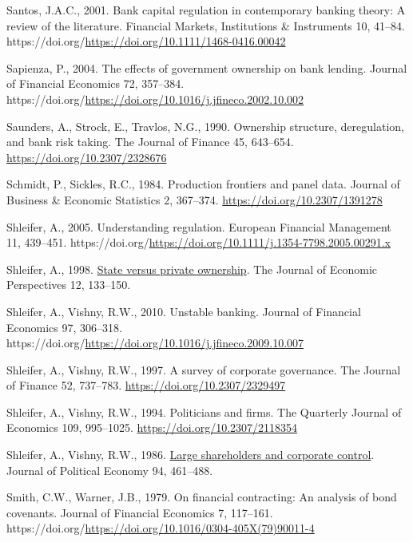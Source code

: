 \documentclass[
  12pt,
  a4paper,
]{scrreprt}
\newlength{\cslhangindent}
\newenvironment{CSLReferences}[2] %
 {\begin{list}{}{%
  \setlength{\itemindent}{0pt}
  \setlength{\leftmargin}{0pt}
  \setlength{\parsep}{0pt}
  \ifodd #1
   \setlength{\leftmargin}{\cslhangindent}
   \setlength{\itemindent}{-1\cslhangindent}
  \fi
  \setlength{\itemsep}{#2\baselineskip}}}
 {\end{list}}
\begin{document}
\begin{CSLReferences}{1}{0}
Santos, J.A.C., 2001. Bank capital regulation in contemporary banking
theory: A review of the literature. Financial Markets, Institutions \&
Instruments 10, 41--84.
https://doi.org/\url{https://doi.org/10.1111/1468-0416.00042}

Sapienza, P., 2004. The effects of government ownership on bank lending.
Journal of Financial Economics 72, 357--384.
https://doi.org/\url{https://doi.org/10.1016/j.jfineco.2002.10.002}

Saunders, A., Strock, E., Travlos, N.G., 1990. Ownership structure,
deregulation, and bank risk taking. The Journal of Finance 45, 643--654.
\url{https://doi.org/10.2307/2328676}

Schmidt, P., Sickles, R.C., 1984. Production frontiers and panel data.
Journal of Business \& Economic Statistics 2, 367--374.
\url{https://doi.org/10.2307/1391278}

Shleifer, A., 2005. Understanding regulation. European Financial
Management 11, 439--451.
https://doi.org/\url{https://doi.org/10.1111/j.1354-7798.2005.00291.x}

Shleifer, A., 1998. \href{http://www.jstor.org/stable/2646898}{State
versus private ownership}. The Journal of Economic Perspectives 12,
133--150.

Shleifer, A., Vishny, R.W., 2010. Unstable banking. Journal of Financial
Economics 97, 306--318.
https://doi.org/\url{https://doi.org/10.1016/j.jfineco.2009.10.007}

Shleifer, A., Vishny, R.W., 1997. A survey of corporate governance. The
Journal of Finance 52, 737--783. \url{https://doi.org/10.2307/2329497}

Shleifer, A., Vishny, R.W., 1994. Politicians and firms. The Quarterly
Journal of Economics 109, 995--1025.
\url{https://doi.org/10.2307/2118354}

Shleifer, A., Vishny, R.W., 1986.
\href{http://www.jstor.org.queens.ezp1.qub.ac.uk/stable/1833044}{Large
shareholders and corporate control}. Journal of Political Economy 94,
461--488.

Smith, C.W., Warner, J.B., 1979. On financial contracting: An analysis
of bond covenants. Journal of Financial Economics 7, 117--161.
https://doi.org/\url{https://doi.org/10.1016/0304-405X(79)90011-4}


\end{CSLReferences}
\end{document}
